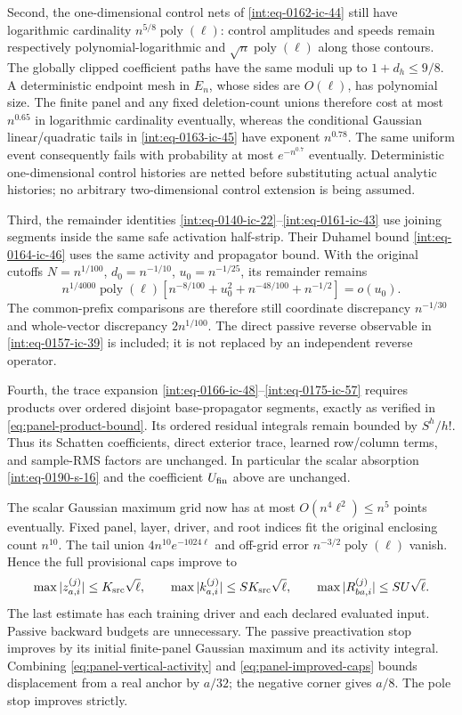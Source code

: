Second, the one-dimensional control nets of
\eqref{int:eq-0162-ic-44} still have logarithmic cardinality
\(n^{5/8}\operatorname{poly}(\ell)\): control amplitudes and speeds
remain respectively polynomial-logarithmic and
\(\sqrt n\operatorname{poly}(\ell)\) along those contours.
The globally clipped coefficient paths have the same moduli up to
\(1+d_h\le9/8\).  A deterministic endpoint mesh in \(E_n\), whose
sides are \(O(\ell)\), has polynomial size.  The finite panel and
any fixed deletion-count unions therefore cost at most \(n^{0.65}\)
in logarithmic cardinality eventually, whereas the conditional Gaussian
linear/quadratic tails in \eqref{int:eq-0163-ic-45} have exponent
\(n^{0.78}\).  The same uniform event consequently fails with
probability at most \(e^{-n^{0.7}}\) eventually.  Deterministic
one-dimensional control histories are netted before substituting actual
analytic histories; no arbitrary two-dimensional control extension is
being assumed.

Third, the remainder identities
\eqref{int:eq-0140-ic-22}--\eqref{int:eq-0161-ic-43} use joining
segments inside the same safe activation half-strip.  Their Duhamel
bound \eqref{int:eq-0164-ic-46} uses the same activity and propagator
bound.  With the original cutoffs \(N=n^{1/100}\),
\(d_0=n^{-1/10}\), \(u_0=n^{-1/25}\), its remainder remains
\[
 n^{1/4000}\operatorname{poly}(\ell)
 [n^{-8/100}+u_0^2+n^{-48/100}+n^{-1/2}]=o(u_0).
\]
The common-prefix comparisons are therefore still coordinate discrepancy
\(n^{-1/30}\) and whole-vector discrepancy \(2n^{1/100}\).
The direct passive reverse observable in
\eqref{int:eq-0157-ic-39} is included; it is not replaced by an
independent reverse operator.

Fourth, the trace expansion
\eqref{int:eq-0166-ic-48}--\eqref{int:eq-0175-ic-57} requires products
over ordered disjoint base-propagator segments, exactly as verified in
\eqref{eq:panel-product-bound}.  Its ordered residual integrals remain
bounded by \(S^h/h!\).  Thus its Schatten coefficients, direct exterior
trace, learned row/column terms, and sample-RMS factors are unchanged.
In particular the scalar absorption \eqref{int:eq-0190-s-16} and
the coefficient \(U_{\rm fin}\) above are unchanged.

The scalar Gaussian maximum grid now has at most
\(O(n^4\ell^2)\le n^5\) points eventually.  Fixed panel, layer,
driver, and root indices fit the original enclosing count \(n^{10}\).
The tail union \(4n^{10}e^{-1024\ell}\) and off-grid error
\(n^{-3/2}\operatorname{poly}(\ell)\) vanish.  Hence the full
provisional caps improve to
\begin{equation}
 \max|z_{a,i}^{(j)}|\le K_{\rm src}\sqrt\ell,\qquad
 \max|k_{a,i}^{(j)}|\le SK_{\rm src}\sqrt\ell,\qquad
 \max|R_{ba,i}^{(j)}|\le SU\sqrt\ell.
 \label{eq:panel-improved-caps}
\end{equation}
The last estimate has each training driver and each declared evaluated
input.  Passive backward budgets are unnecessary.  The passive
preactivation stop improves by its initial finite-panel Gaussian maximum
and its activity integral.  Combining
\eqref{eq:panel-vertical-activity} and \eqref{eq:panel-improved-caps}
bounds displacement from a real anchor by \(a/32\); the negative corner
gives \(a/8\).  The pole stop improves strictly.

